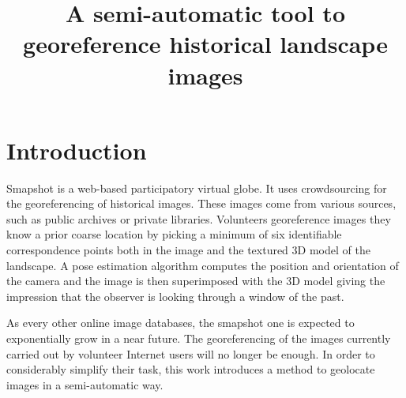\documentclass[fleqn,10pt]{wlpeerj} %
\title{A semi-automatic tool to georeference historical landscape images}
\begin{document}
\flushbottom
\maketitle
\thispagestyle{empty}

\section*{Introduction}
Smapshot is a web-based participatory virtual globe. It uses crowdsourcing for 
the georeferencing of historical images. These images come from various sources, 
such as public archives or private libraries. Volunteers georeference images 
they know a prior coarse location by picking a minimum of six identifiable 
correspondence points both in the image and the textured 3D model of the landscape. 
A pose estimation algorithm computes the position and orientation of the camera 
and the image is then superimposed  with the 3D model giving the impression that 
the observer is looking through a window of the past.

As every other online image databases, the smapshot one is expected to 
exponentially grow in a near future. The georeferencing of the images currently 
carried out by volunteer Internet users will no longer be enough.
In order to considerably simplify their task, this work introduces a method to
geolocate images in a semi-automatic way.

\end{document}
